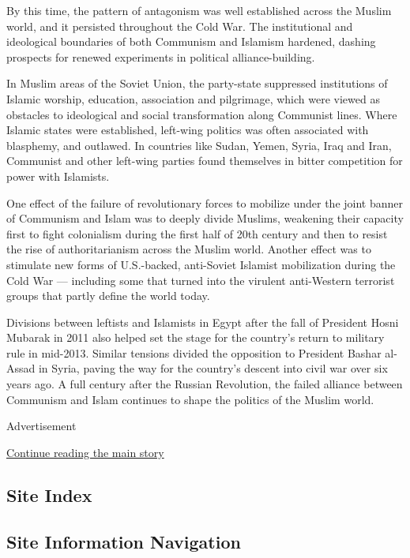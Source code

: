 By this time, the pattern of antagonism was well established across the
Muslim world, and it persisted throughout the Cold War. The
institutional and ideological boundaries of both Communism and Islamism
hardened, dashing prospects for renewed experiments in political
alliance-building.

In Muslim areas of the Soviet Union, the party-state suppressed
institutions of Islamic worship, education, association and pilgrimage,
which were viewed as obstacles to ideological and social transformation
along Communist lines. Where Islamic states were established, left-wing
politics was often associated with blasphemy, and outlawed. In countries
like Sudan, Yemen, Syria, Iraq and Iran, Communist and other left-wing
parties found themselves in bitter competition for power with Islamists.

One effect of the failure of revolutionary forces to mobilize under the
joint banner of Communism and Islam was to deeply divide Muslims,
weakening their capacity first to fight colonialism during the first
half of 20th century and then to resist the rise of authoritarianism
across the Muslim world. Another effect was to stimulate new forms of
U.S.-backed, anti-Soviet Islamist mobilization during the Cold War ---
including some that turned into the virulent anti-Western terrorist
groups that partly define the world today.

Divisions between leftists and Islamists in Egypt after the fall of
President Hosni Mubarak in 2011 also helped set the stage for the
country's return to military rule in mid-2013. Similar tensions divided
the opposition to President Bashar al-Assad in Syria, paving the way for
the country's descent into civil war over six years ago. A full century
after the Russian Revolution, the failed alliance between Communism and
Islam continues to shape the politics of the Muslim world.

Advertisement

\protect\hyperlink{after-bottom}{Continue reading the main story}

\hypertarget{site-index}{%
\subsection{Site Index}\label{site-index}}

\hypertarget{site-information-navigation}{%
\subsection{Site Information
Navigation}\label{site-information-navigation}}

